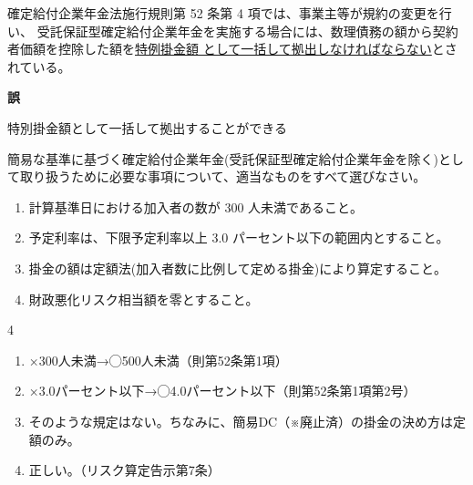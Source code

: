 \begin{truefalse}[年金2 2020 問題1(1)\textcircled{5}]
  確定給付企業年金法施行規則第 52 条第 4 項では、事業主等が規約の変更を行い、
  受託保証型確定給付企業年金を実施する場合には、数理債務の額から契約者価額を控除した額を\underline{特例掛金額
  として一括して拠出しなければならない}とされている。
\end{truefalse}

\begin{answerbox}
  \textbf{誤}

  特別掛金額として一括して拠出することができる
\end{answerbox}

\begin{truefalse}[年金2 2024 問題1(1)ウ]
  簡易な基準に基づく確定給付企業年金(受託保証型確定給付企業年金を除く)として取り扱うために必要な事項について、適当なものをすべて選びなさい。

\begin{enumerate}
  \item 計算基準日における加入者の数が 300 人未満であること。
  \item 予定利率は、下限予定利率以上 3.0 パーセント以下の範囲内とすること。
  \item 掛金の額は定額法(加入者数に比例して定める掛金)により算定すること。
  \item 財政悪化リスク相当額を零とすること。
\end{enumerate}
\end{truefalse}

\begin{answerbox}
  4
\end{answerbox}

\begin{explanationbox}
  \begin{enumerate}
    \item ×300人未満→◯500人未満（則第52条第1項）
    \item ×3.0パーセント以下→◯4.0パーセント以下（則第52条第1項第2号）
    \item そのような規定はない。ちなみに、簡易DC（※廃止済）の掛金の決め方は定額のみ。
    \item 正しい。（リスク算定告示第7条）
  \end{enumerate}
\end{explanationbox}


